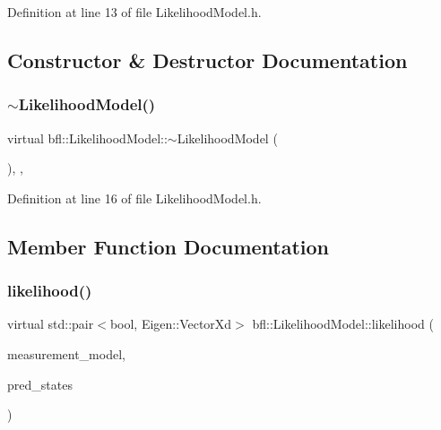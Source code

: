 Definition at line 13 of file Likelihood\+Model.\+h.



\subsection{Constructor \& Destructor Documentation}
\mbox{\label{classbfl_1_1LikelihoodModel_a48cf7a324006ab2d1162dccfab7fd138}} 
\subsubsection{\texorpdfstring{$\sim$\+Likelihood\+Model()}{~LikelihoodModel()}}
{\footnotesize\ttfamily virtual bfl\+::\+Likelihood\+Model\+::$\sim$\+Likelihood\+Model (\begin{DoxyParamCaption}{ }\end{DoxyParamCaption})\hspace{0.3cm}{\ttfamily [inline]}, {\ttfamily [virtual]}, {\ttfamily [noexcept]}}



Definition at line 16 of file Likelihood\+Model.\+h.



\subsection{Member Function Documentation}
\mbox{\label{classbfl_1_1LikelihoodModel_a401a363bea9178f568ca4968f9d170b0}} 
\subsubsection{\texorpdfstring{likelihood()}{likelihood()}}
{\footnotesize\ttfamily virtual std\+::pair$<$bool, Eigen\+::\+Vector\+Xd$>$ bfl\+::\+Likelihood\+Model\+::likelihood (\begin{DoxyParamCaption}\item[{const \mbox{\hyperlink{classbfl_1_1MeasurementModel}{Measurement\+Model}} \&}]{measurement\+\_\+model,  }\item[{const Eigen\+::\+Ref$<$ const Eigen\+::\+Matrix\+Xd $>$ \&}]{pred\+\_\+states }\end{DoxyParamCaption})\hspace{0.3cm}{\ttfamily [pure virtual]}}



